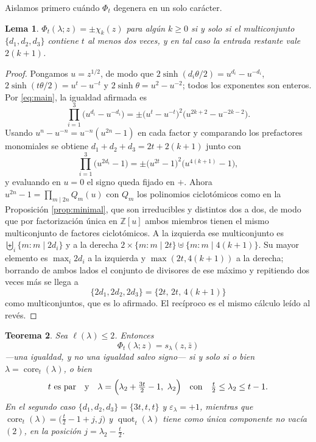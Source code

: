 \documentclass[11pt,reqno]{amsart}
\theoremstyle{plain}
\newtheorem{theorem}{Teorema}[section]
\newtheorem{lemma}[theorem]{Lema}
\theoremstyle{definition}
\newcommand{\ZZ}{\mathbb{Z}}
\newcommand{\core}{\operatorname{core}}
\newcommand{\quot}{\operatorname{quot}}
\newcommand{\zb}{\bar z}
\begin{document}
Aislamos primero cuándo $\Phi_t$ degenera en un solo carácter.

\begin{lemma}\label{lem:single}
$\Phi_t(\lambda;z)=\pm\chi_k(z)$ para algún $k\ge0$ si y solo si el multiconjunto $\{d_1,d_2,d_3\}$
contiene $t$ al menos dos veces, y en tal caso la entrada restante vale $2(k+1)$.
\end{lemma}

\begin{proof}
Pongamos $u=z^{1/2}$, de modo que $2\sinh(d_i\theta/2)=u^{d_i}-u^{-d_i}$,
$2\sinh(t\theta/2)=u^{t}-u^{-t}$ y $2\sinh\theta=u^{2}-u^{-2}$; todos los exponentes son enteros. Por
\eqref{eq:main}, la igualdad afirmada es
\[
\prod_{i=1}^{3}\bigl(u^{d_i}-u^{-d_i}\bigr)
=\pm\bigl(u^{t}-u^{-t}\bigr)^{2}\bigl(u^{2k+2}-u^{-2k-2}\bigr).
\]
Usando $u^{n}-u^{-n}=u^{-n}(u^{2n}-1)$ en cada factor y comparando los prefactores monomiales se
obtiene $d_1+d_2+d_3=2t+2(k+1)$ junto con
\[
\prod_{i=1}^{3}\bigl(u^{2d_i}-1\bigr)=\pm\bigl(u^{2t}-1\bigr)^{2}\bigl(u^{4(k+1)}-1\bigr),
\]
y evaluando en $u=0$ el signo queda fijado en $+$. Ahora $u^{2n}-1=\prod_{m\mid 2n}Q_m(u)$ con
$Q_m$ los polinomios ciclotómicos como en la Proposición \ref{prop:minimal}, que son irreducibles y
distintos dos a dos, de modo que por
factorización única en $\ZZ[u]$ ambos miembros tienen el mismo multiconjunto de factores
ciclotómicos. A la izquierda ese multiconjunto es $\biguplus_i\{m:m\mid 2d_i\}$ y a la derecha
$2\times\{m:m\mid 2t\}\uplus\{m:m\mid 4(k+1)\}$. Su mayor elemento es $\max_i 2d_i$ a la izquierda y
$\max(2t,4(k+1))$ a la derecha; borrando de ambos lados el conjunto de divisores de ese máximo y
repitiendo dos veces más se llega a
\[
\{2d_1,2d_2,2d_3\}=\{2t,\,2t,\,4(k+1)\}
\]
como multiconjuntos, que es lo afirmado. El recíproco es el mismo cálculo leído al revés.
\end{proof}

\begin{theorem}\label{thm:extra}
Sea $\ell(\lambda)\le2$. Entonces
\[
\Phi_t(\lambda;z)=s_\lambda(z,\zb)
\]
---una igualdad, y no una igualdad salvo signo--- si y solo si o bien
$\lambda=\core_t(\lambda)$, o bien
\begin{equation}\label{eq:extra}
t\ \text{es par}\quad\text{y}\quad \lambda=\Bigl(\lambda_2+\tfrac{3t}{2}-1,\ \lambda_2\Bigr)
\quad\text{con}\quad \tfrac t2\le\lambda_2\le t-1 .
\end{equation}
En el segundo caso $\{d_1,d_2,d_3\}=\{3t,t,t\}$ y $\varepsilon_\lambda=+1$, mientras que
$\core_t(\lambda)=\bigl(\tfrac t2-1+j,j\bigr)$ y $\quot_t(\lambda)$ tiene como única componente no
vacía $(2)$, en la posición $j=\lambda_2-\tfrac t2$.
\end{theorem}
\end{document}
